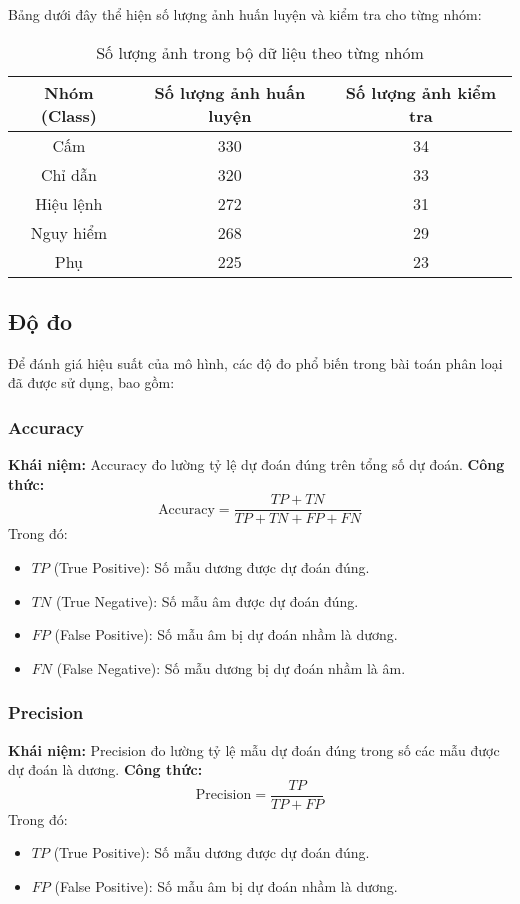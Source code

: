 \documentclass[a4paper,12pt]{article}
\begin{document}
Bảng dưới đây thể hiện số lượng ảnh huấn luyện và kiểm tra cho từng nhóm:  

\begin{table}[H]
    \begin{tabular}{|c|c|c|}
        \hline
        \textbf{Nhóm (Class)} & \textbf{Số lượng ảnh huấn luyện} & \textbf{Số lượng ảnh kiểm tra} \\ \hline
        Cấm & 330 & 34 \\ \hline
        Chỉ dẫn & 320 & 33 \\ \hline
        Hiệu lệnh & 272 & 31 \\ \hline
        Nguy hiểm & 268 & 29 \\ \hline
        Phụ & 225 & 23 \\ \hline
    \end{tabular}
    \centering
    \caption{Số lượng ảnh trong bộ dữ liệu theo từng nhóm}
\end{table}

\subsection{Độ đo}
Để đánh giá hiệu suất của mô hình, các độ đo phổ biến trong bài toán phân loại đã được sử dụng, bao gồm:  

\subsubsection{Accuracy}
\textbf{Khái niệm:} Accuracy đo lường tỷ lệ dự đoán đúng trên tổng số dự đoán.  
\textbf{Công thức:}  
\[
\text{Accuracy} = \frac{TP + TN}{TP + TN + FP + FN}
\]
Trong đó:
\begin{itemize}
    \item \(TP\) (True Positive): Số mẫu dương được dự đoán đúng.
    \item \(TN\) (True Negative): Số mẫu âm được dự đoán đúng.
    \item \(FP\) (False Positive): Số mẫu âm bị dự đoán nhầm là dương.
    \item \(FN\) (False Negative): Số mẫu dương bị dự đoán nhầm là âm.
\end{itemize}

\subsubsection{Precision}
\textbf{Khái niệm:} Precision đo lường tỷ lệ mẫu dự đoán đúng trong số các mẫu được dự đoán là dương.  
\textbf{Công thức:}  
\[
\text{Precision} = \frac{TP}{TP + FP}
\]
Trong đó:
\begin{itemize}
    \item \(TP\) (True Positive): Số mẫu dương được dự đoán đúng.
    \item \(FP\) (False Positive): Số mẫu âm bị dự đoán nhầm là dương.
\end{itemize}
\end{document}

